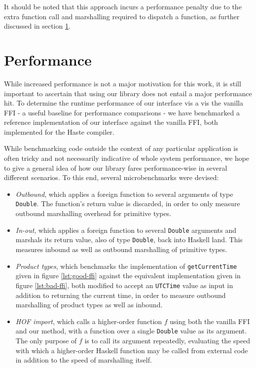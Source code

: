 \documentclass[preprint]{sigplanconf}
\begin{document}
It should be noted that this approach incurs a performance penalty due to the
extra function call and marshalling required to dispatch a function, as further
discussed in section \ref{sec:performance}.


\section{Performance}
\label{sec:performance}
While increased performance is not a major motivation for this work, it is
still important to ascertain that using our library does not entail a major
performance hit. To determine the runtime performance of our interface
vis a vis the vanilla FFI - a useful baseline for performance comparisons - we
have benchmarked a reference implementation of our interface against the
vanilla FFI, both implemented for the Haste compiler.

While benchmarking code outside the context of any particular application is
often tricky and not necessarily indicative of whole system performance,
we hope to give a general idea of how our library fares performance-wise in
several different scenarios.
To this end, several microbenchmarks were devised:

\begin{itemize}
\item
  \emph{Outbound}, which applies a foreign function to several arguments of
  type \lstinline!Double!. The function's return value is discarded, in order
  to only measure outbound marshalling overhead for primitive types.
\item
  \emph{In-out}, which applies a foreign function to several \lstinline!Double!
  arguments and marshals its return value, also of type \lstinline!Double!,
  back into Haskell land. This measures inbound as well as outbound marshalling
  of primitive types.
\item
  \emph{Product types}, which benchmarks the implementation of\linebreak
  \lstinline!getCurrentTime! given in figure \ref{lst:good-ffi} against
  the equivalent implementation given in figure \ref{lst:bad-ffi}, both
  modified to accept an \lstinline!UTCTime! value as input in addition to
  returning the current time, in order to measure outbound marshalling of
  product types as well as inbound.
\item
  \emph{HOF import}, which calls a higher-order function $f$ using
  both the vanilla FFI and our method, with a function over a
  single \lstinline!Double! value as its argument.
  The only purpose of $f$ is to call its argument repeatedly,
  evaluating the speed with which a higher-order Haskell function may be called
  from external code in addition to the speed of marshalling itself.
\end{itemize}
\end{document}
